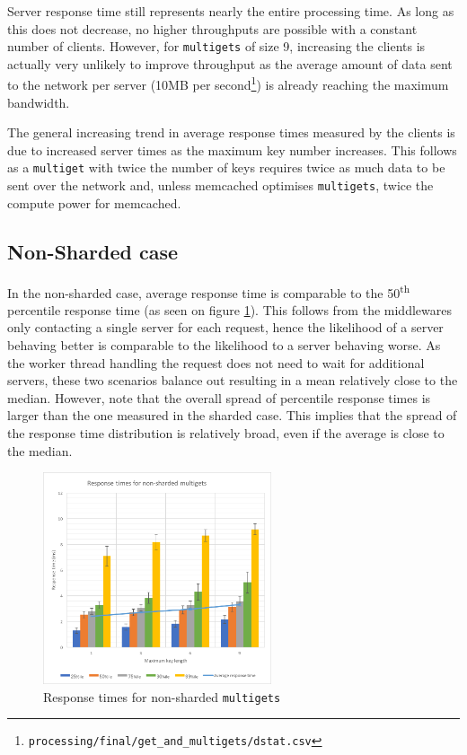 \documentclass[11pt,a4paper]{article}
\begin{document}
Server response time still represents nearly the entire processing time. As long as this does not decrease, no higher throughputs are possible with a constant number of clients. However, for \texttt{multigets} of size 9, increasing the clients is actually very unlikely to improve throughput as the average amount of data sent to the network per server (10MB per second\footnote{\texttt{processing/final/get_and_multigets/dstat.csv}}) is already reaching the maximum bandwidth.

The general increasing trend in average response times measured by the clients is due to increased server times as the maximum key number increases. This follows as a \texttt{multiget} with twice the number of keys requires twice as much data to be sent over the network and, unless memcached optimises \texttt{multigets}, twice the compute power for memcached.

\subsection{Non-Sharded case}
In the non-sharded case, average response time is comparable to the 50\textsuperscript{th} percentile response time (as seen on figure \ref{png::get_and_multigets_latency-keylen_non-sharded}). This follows from the middlewares only contacting a single server for each request, hence the likelihood of a server behaving better is comparable to the likelihood to a server behaving worse. As the worker thread handling the request does not need to wait for additional servers, these two scenarios balance out resulting in a mean relatively close to the median. However, note that the overall spread of percentile response times is larger than the one measured in the sharded case. This implies that the spread of the response time distribution is relatively broad, even if the average is close to the median.

\begin{figure}[!h]
    \centering
    \includegraphics[width=0.6\textwidth]{processing/graphics/get_and_multigets_latency-keylen_non-sharded.png}
    \caption{Response times for non-sharded \texttt{multigets}}
    \label{png::get_and_multigets_latency-keylen_non-sharded}
\end{figure}
\end{document}
